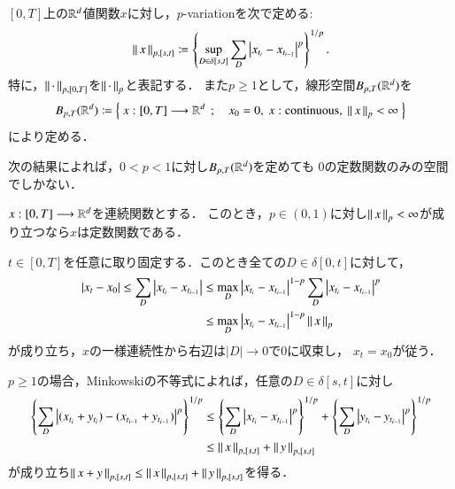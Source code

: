 \begin{screen}
	\begin{dfn}[$p$-variation]
		$[0,T]$上の$\mathbb{R}^d$値関数$x$に対し，$p$-variationを次で定める:
		\begin{align}
			\left\|\, x\, \right\|_{p,[s,t]}
			\coloneqq \left\{ \operatorname*{sup}_{D \in \delta[s,t]} \sum_{D} 
				\left| x_{t_i} - x_{t_{i-1}} \right|^p \right\}^{1/p}.
		\end{align}
		特に，$\left\|\, \cdot\, \right\|_{p,[0,T]}$を$\left\|\, \cdot\, \right\|_{p}$と表記する．
		また$p \geq 1$として，線形空間$B_{p,T}(\mathbb{R}^d)$を
		\begin{align}
			B_{p,T}(\R^d)
			\coloneqq \Set{x:[0,T] \longrightarrow \R^d}{x_0=0,\ x:\mbox{continuous},\ \Norm{x}{p} < \infty}
		\end{align}
		により定める．
	\end{dfn}
\end{screen}

次の結果によれば，$0 < p < 1$に対し$B_{p,T}(\mathbb{R}^d)$を定めても
$0$の定数関数のみの空間でしかない．
\begin{screen}
	\begin{thm}
		$x:[0,T] \longrightarrow \mathbb{R}^d$を連続関数とする．
		このとき，$p \in (0, 1)$に対し$\left\|\, x\, \right\|_{p} < \infty$が成り立つなら$x$は定数関数である．
	\end{thm}
\end{screen}

\begin{prf}
	$t \in [0,T]$を任意に取り固定する．このとき全ての$D \in \delta[0,t]$に対して，
	\begin{align}
		|x_t - x_0| \leq \sum_D \left| x_{t_i} - x_{t_{i-1}} \right|
		&\leq \operatorname*{max}_{D} \left| x_{t_i} - x_{t_{i-1}} \right|^{1-p} 
			\sum_D \left| x_{t_i} - x_{t_{i-1}} \right|^p \\
		&\leq \operatorname*{max}_{D} \left| x_{t_i} - x_{t_{i-1}} \right|^{1-p} \left\|\, x\, \right\|_{p}
	\end{align}
	が成り立ち，$x$の一様連続性から右辺は$|D| \longrightarrow 0$で$0$に収束し，
	$x_t = x_0$が従う．
	\QED
\end{prf}

$p \geq 1$の場合，Minkowskiの不等式によれば，任意の$D \in \delta[s,t]$に対し
\begin{align}
	\left\{ \sum_D \left| (x_{t_i} + y_{t_i}) - (x_{t_{i-1}} + y_{t_{i-1}}) \right|^p \right\}^{1/p}
	&\leq \left\{ \sum_D \left| x_{t_i} - x_{t_{i-1}} \right|^p \right\}^{1/p}
		+ \left\{ \sum_D \left| y_{t_i} - y_{t_{i-1}} \right|^p \right\}^{1/p} \\
	&\leq \left\|\, x\, \right\|_{p,[s,t]} + \left\|\, y\, \right\|_{p,[s,t]}
\end{align}
が成り立ち$\left\|\, x + y\, \right\|_{p,[s,t]} \leq \left\|\, x\, \right\|_{p,[s,t]} + \left\|\, y\, \right\|_{p,[s,t]}$を得る．

